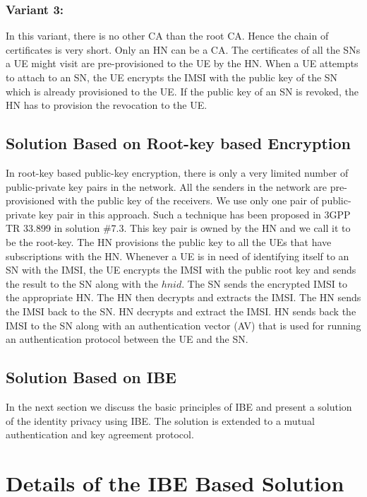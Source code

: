 \documentclass[runningheads,a4paper]{llncs} %
\begin{document}
\subsubsection{Variant 3:}
In this variant, there is no other CA than the root CA. Hence the chain of certificates is very short. Only an HN can be a CA. The certificates of all the SNs a UE might visit are pre-provisioned to the UE by the HN. When a UE attempts to attach to an SN, the UE encrypts the IMSI with the public key of the SN which is already provisioned to the UE. If the public key of an SN is revoked, the HN has to provision the revocation to the UE.


\subsection{Solution Based on Root-key based Encryption} 
\label{sub_sec:solution_root-key}
In root-key based public-key encryption, there is only a very limited number of public-private key pairs in the network. All the senders in the network are pre-provisioned with the public key of the receivers. We use only one pair of public-private key pair in this approach. Such a technique has been proposed in 3GPP TR 33.899 in solution \#7.3. This key pair is owned by the HN and we call it to be the root-key. The HN provisions the public key to all the UEs that have subscriptions with the HN.  Whenever a UE is in need of identifying itself to an SN with the IMSI, the UE encrypts the IMSI with the public root key and sends the result to the SN along with the $hnid$. The SN sends the encrypted IMSI to the appropriate HN. The HN then decrypts and extracts the IMSI. The HN sends the IMSI back to the SN. HN decrypts and extract the IMSI. HN sends back the IMSI to the SN along with an authentication vector (AV) that is used for running an authentication protocol between the UE and the SN.

\subsection{Solution Based on IBE}
In the next section we discuss the basic principles of IBE and present a solution of the identity privacy using IBE. The solution is extended to a mutual authentication and key agreement protocol.


\section{Details of the IBE Based Solution} 
\label{sec:solutions_based_on_IBE}
\end{document}
